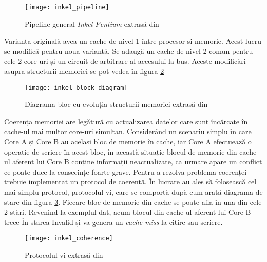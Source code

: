 \documentclass[../main.tex]{subfiles}
\begin{document}
\begin{figure}[h]
    \centering
    \texttt{[image: inkel\_pipeline]}
    \caption{Pipeline general \emph{Inkel Pentium} extrasă din \cite{inkel}}
    \label{fig:inkel_pipeline}
\end{figure}

Varianta originală avea un cache de nivel 1 între procesor si memorie. Acest lucru se modifică pentru noua variantă.
Se adaugă un cache de nivel 2 comun pentru cele 2 core-uri și un circuit de arbitrare al accesului la bus. Aceste
modificări asupra structurii memoriei se pot vedea în figura \ref{fig:inkel_block_diagram}

\begin{figure}[h]
    \centering
    \texttt{[image: inkel\_block\_diagram]}
    \caption{Diagrama bloc cu evoluția structurii memoriei extrasă din \cite{inkel}}
    \label{fig:inkel_block_diagram}
\end{figure}

Coerența memoriei are legătură cu actualizarea datelor care sunt încărcate în cache-ul mai multor core-uri simultan.
Considerând un scenariu simplu în care Core A și Core B au același bloc de memorie în cache, iar Core A efectuează o
operatie de scriere în acest bloc, în această situație blocul de memorie din cache-ul aferent lui Core B conține informații
neactualizate, ca urmare apare un conflict ce poate duce la consecințe foarte grave. Pentru a rezolva problema coerenței
trebuie implementat un protocol de coerență. În lucrare au ales să folosească cel mai simplu protocol, protocolul \acrfull{vi},
care se comportă după cum arată diagrama de stare din figura \ref{fig:inkel_coherence}. Fiecare bloc de memorie din cache
se poate afla în una din cele 2 stări. Revenind la exemplul dat, acum blocul din cache-ul aferent lui Core B trece În
starea Invalid și va genera un \emph{cache miss} la citire sau scriere.

\begin{figure}[h]
    \centering
    \texttt{[image: inkel\_coherence]}
    \caption{Protocolul \acrshort{vi} extrasă din \cite{inkel}}
    \label{fig:inkel_coherence}
\end{figure}
\end{document}
